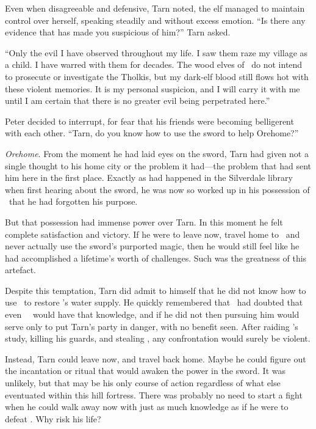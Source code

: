 Even when disagreeable and defensive, Tarn noted, the elf managed to maintain control over herself, speaking steadily and without excess emotion. ``Is there any evidence that has made you suspicious of him?''  Tarn asked.

``Only the evil I have observed throughout my life.  I saw them raze my village as a child.  I have warred with them for decades.  The wood elves of \inarthonor\ do not intend to prosecute or investigate the Tholkis, but my dark-elf blood still flows hot with these violent memories.  It is my personal suspicion, and I will carry it with me until I am certain that there is no greater evil being perpetrated here.''

Peter decided to interrupt, for fear that his friends were becoming belligerent with each other.  ``Tarn, do you know how to use the sword to help Orehome?''

\emph{Orehome}.  From the moment he had laid eyes on the sword, Tarn had given not a single thought to his home city or the problem it had---the problem that had sent him here in the first place.  Exactly as had happened in the Silverdale library when first hearing about the sword, he was now so worked up in his possession of \kildir\ that he had forgotten his purpose.

But that possession had immense power over Tarn.  In this moment he felt complete satisfaction and victory.  If he were to leave now, travel home to \korbarthrond\ and never actually use the sword's purported magic, then he would still feel like he had accomplished a lifetime's worth of challenges.  Such was the greatness of this artefact.

Despite this temptation, Tarn did admit to himself that he did not know how to use \kildir\ to restore \korbarthrond's water supply.  He quickly remembered that \arilor\ had doubted that even \mothzam\ \driktur\ would have that knowledge, and if he did not then pursuing him would serve only to put Tarn's party in danger, with no benefit seen.  After raiding \mothzam's study, killing his guards, and stealing \kildir, any confrontation would surely be violent.

Instead, Tarn could leave now, and travel back home.  Maybe he could figure out the incantation or ritual that would awaken the power in the sword.  It was unlikely, but that may be his only course of action regardless of what else eventuated within this hill fortress.  There was probably no need to start a fight when he could walk away now with just as much knowledge as if he were to defeat \mothzam.  Why risk his life?

